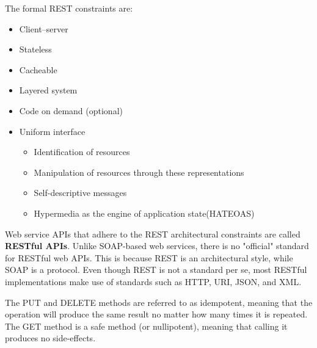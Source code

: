 The formal REST constraints are:
\begin{itemize}
  \item Client–server
  \item Stateless
  \item Cacheable
  \item Layered system
  \item Code on demand (optional)
  \item Uniform interface
  \begin{itemize}
    \item Identification of resources
    \item Manipulation of resources through these representations
    \item Self-descriptive messages
    \item Hypermedia as the engine of application state(HATEOAS)
\end{itemize}
\end{itemize}

Web service APIs that adhere to the REST architectural constraints are called \textbf{RESTful APIs}.
Unlike SOAP-based web services, there is no "official" standard for RESTful web APIs.
This is because REST is an architectural style, while SOAP is a protocol.
Even though REST is not a standard per se, most RESTful implementations make use of standards such as HTTP, URI, JSON, and XML.

The PUT and DELETE methods are referred to as idempotent, meaning that the
operation will produce the same result no matter how many times it is repeated. 
The GET method is a safe method (or nullipotent), meaning that calling it produces no side-effects.







